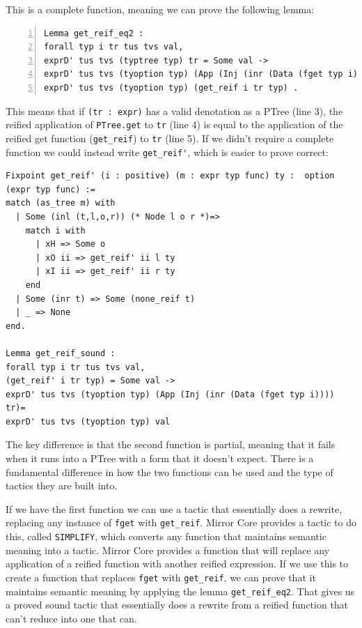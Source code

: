 \documentclass{puthesis}
\begin{document}
This is a complete function, meaning we can prove the following lemma:

\begin{lstlisting}[numbers=left]
Lemma get_reif_eq2 :
forall typ i tr tus tvs val,
exprD' tus tvs (typtree typ) tr = Some val ->
exprD' tus tvs (tyoption typ) (App (Inj (inr (Data (fget typ i)))) tr)  =
exprD' tus tvs (tyoption typ) (get_reif i tr typ) .
\end{lstlisting}

This means that if \lstinline|(tr : expr)| has a valid denotation as a
PTree (line 3), the reified application of \lstinline|PTree.get| to
\lstinline|tr| (line 4) is equal to the application of the reified get
function (\lstinline|get_reif|) to \lstinline|tr| (line 5).  If we
didn't require a complete function we could instead write
\lstinline|get_reif'|, which is easier to prove correct:

\begin{lstlisting}
Fixpoint get_reif' (i : positive) (m : expr typ func) ty :  option (expr typ func) :=
match (as_tree m) with
  | Some (inl (t,l,o,r)) (* Node l o r *)=>
    match i with 
      | xH => Some o
      | xO ii => get_reif' ii l ty 
      | xI ii => get_reif' ii r ty 
    end
  | Some (inr t) => Some (none_reif t)
  | _ => None
end.

Lemma get_reif_sound :
forall typ i tr tus tvs val,
(get_reif' i tr typ) = Some val ->
exprD' tus tvs (tyoption typ) (App (Inj (inr (Data (fget typ i)))) tr)= 
exprD' tus tvs (tyoption typ) val
\end{lstlisting}

The key difference is that the second function is partial, meaning
that it fails when it runs into a PTree with a form that it doesn't
expect. There is a fundamental difference in how the two functions can
be used and the type of tactics they are built into.

If we have the first function we can use a tactic that essentially
does a rewrite, replacing any instance of \lstinline|fget| with
\lstinline|get_reif|. Mirror Core provides a tactic to do this, called
\lstinline|SIMPLIFY|, which converts any function that maintains
semantic meaning into a tactic. Mirror Core provides a function that
will replace any application of a reified function with another
reified expression. If we use this to create a function that replaces
\lstinline|fget| with \lstinline|get_reif|, we can prove that it
maintains semantic meaning by applying the lemma
\lstinline|get_reif_eq2|. That gives us a proved sound tactic that
essentially does a rewrite from a reified function that can't reduce
into one that can. 
\end{document}
